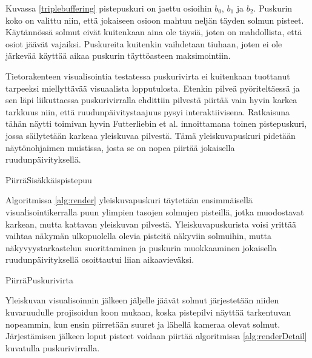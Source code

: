 Kuvassa \ref{triplebuffering} pistepuskuri on jaettu osioihin $b_0$, $b_1$ ja $b_2$. Puskurin koko on valittu niin, että jokaiseen osioon mahtuu neljän täyden solmun pisteet. Käytännössä solmut eivät kuitenkaan aina ole täysiä, joten on mahdollista, että osiot jäävät vajaiksi. Puskureita kuitenkin vaihdetaan tiuhaan, joten ei ole järkevää käyttää aikaa puskurin täyttöasteen maksimointiin.

Tietorakenteen visualisointia testatessa puskurivirta ei kuitenkaan tuottanut tarpeeksi miellyttävää visuaalista lopputulosta. Etenkin pilveä pyöriteltäessä ja sen läpi liikuttaessa puskurivirralla ehdittiin pilvestä piirtää vain hyvin karkea tarkkuus niin, että ruudunpäivitystaajuus pysyi interaktiivisena. Ratkaisuna tähän näytti toimivan hyvin Futterliebin et al. \cite{smooth} innoittamana toinen pistepuskuri, jossa säilytetään karkeaa yleiskuvaa pilvestä. Tämä yleiskuvapuskuri pidetään näytönohjaimen muistissa, josta se on nopea piirtää jokaisella ruudunpäivityksellä. 

\begin{algorithm}[!h]
    \caption{PiirräSisäkkäispistepuu}
    \label{alg:render}
    
\end{algorithm}

Algoritmissa \ref{alg:render} yleiskuvapuskuri täytetään ensimmäisellä visualisointikerralla puun ylimpien tasojen solmujen pisteillä, jotka muodostavat karkean, mutta kattavan yleiskuvan pilvestä. Yleiskuvapuskurista voisi yrittää vaihtaa näkymän ulkopuolella olevia pisteitä näkyviin solmuihin, mutta näkyvyystarkastelun suorittaminen ja puskurin muokkaaminen jokaisella ruudunpäivityksellä osoittautui liian aikaavieväksi. 

\begin{algorithm}[!h]
    \caption{PiirräPuskurivirta}
    \label{alg:renderDetail}
    
\end{algorithm}

Yleiskuvan visualisoinnin jälkeen jäljelle jäävät solmut järjestetään niiden kuvaruudulle projisoidun koon mukaan, koska pistepilvi näyttää tarkentuvan nopeammin, kun ensin piirretään suuret ja lähellä kameraa olevat solmut. Järjestämisen jälkeen loput pisteet voidaan piirtää algoritmissa \ref{alg:renderDetail} kuvatulla puskurivirralla. 

